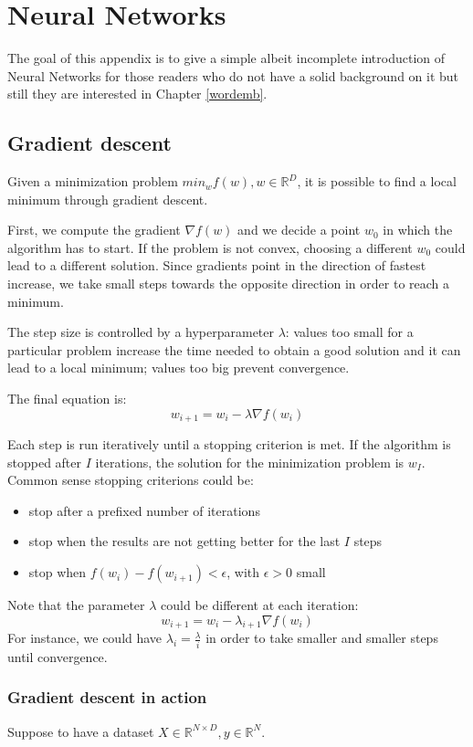 \chapter{Neural Networks}
The goal of this appendix is to give a simple albeit incomplete introduction of
Neural Networks for those readers who do not have a solid background on it but
still they are interested in Chapter \ref{wordemb}.

\section{Gradient descent}
Given a minimization problem $min_w f(w), w \in \mathbb{R}^D$,
it is possible to find a local minimum through gradient descent.

First, we compute the gradient $\nabla f(w)$ and we decide a point $w_0$ in which the algorithm has to start.
If the problem is not convex, choosing a different $w_0$ could lead to a different
solution.
Since gradients point in the direction of fastest increase,
we take small steps towards the opposite direction in order to reach a minimum.

The step size is controlled by a hyperparameter $\lambda$:
values too small for a particular problem increase
the time needed to obtain a good solution and
it can lead to a local minimum;
values too big prevent convergence.

The final equation is:
\[ w_{i+1} = w_{i} - \lambda \nabla f(w_i) \]

Each step is run iteratively until a stopping criterion is met.
If the algorithm is stopped after $I$ iterations, the solution
for the minimization problem is $w_{I}$.
Common sense stopping criterions could be:
\begin{itemize}
    \item stop after a prefixed number of iterations
    \item stop when the results are not getting better for the last $I$ steps
    \item stop when $f(w_i) - f(w_{i+1}) < \epsilon$, with $\epsilon > 0$ small
\end{itemize}

Note that the parameter $\lambda$ could be different at each iteration:
\[ w_{i+1} = w_{i} - \lambda_{i+1} \nabla f(w_i) \]
For instance, we could have $\lambda_i = \frac{\lambda}{i}$ in order to take
smaller and smaller steps until convergence.

\subsection{Gradient descent in action} \label{gradesc}
Suppose to have a dataset $X \in \mathbb{R}^{N \times D}, y \in \mathbb{R}^N$.

